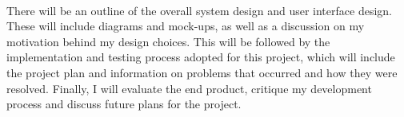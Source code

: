 	\paragraph{}{
	There will be an outline of the overall system design and user interface design. These will include diagrams and mock-ups, as well as a discussion on my motivation behind my design choices. This will be followed by the implementation and testing process adopted for this project, which will include the project plan and information on problems that occurred and how they were resolved. Finally, I will evaluate the end product, critique my development process and discuss future plans for the project.
	}